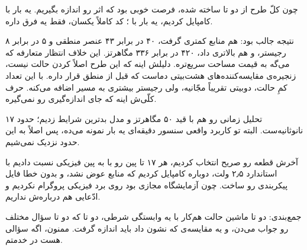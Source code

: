 \documentclass[12pt,a4paper]{article}
\newcommand{\cue}[2]{%
  \par\addvspace{1.1em}%
  \noindent{\small\bfseries\color{cuecolor}\lr{#1}\quad\textbullet\quad #2}%
  \par\nobreak\addvspace{0.3em}%
}
\begin{document}
چون کلّ طرح از دو تا  ساخته شده، فرصت خوبی بود که اثر  رو اندازه بگیریم. یه بار با  کامپایل کردیم، یه بار با ؛ کد کاملاً یکسان، فقط یه  فرق داره.

نتیجه جالب بود:  هم منابع کمتری گرفت، ۴۰ در برابر ۴۳ عنصر منطقی و ۵ در برابر ۸ رجیستر، و هم  بالاتری داد، ۴۲۰ در برابر ۳۳۶ مگاهرتز. این خلاف انتظار متعارفه که می‌گه  به قیمت مساحت سریع‌تره. دلیلش اینه که  این طرح اصلاً  کردن حالت نیست، زنجیره‌ی مقایسه‌کننده‌های هشت‌بیتی دماست که قبل از منطق  قرار داره. با این تعداد کمِ حالت،  دوبیتی تقریباً مجّانیه، ولی  رجیستر بیشتری به مسیر اضافه می‌کنه. حرف کلّی‌ش اینه که  جای اندازه‌گیری رو نمی‌گیره.

تحلیل زمانی رو هم با قید ۵۰ مگاهرتز و مدل بدترین شرایط زدیم؛  حدود ۱۷ نانوثانیه‌ست. البته تو کاربرد واقعی سنسور دقیقه‌ای یه بار نمونه می‌ده، پس اصلاً به این حدود نزدیک نمی‌شیم.

\cue{4:50}{جمع‌بندی}
آخرش قطعه رو صریح انتخاب کردیم، هر ۱۷ تا پین رو با  به پین فیزیکی نسبت دادیم با استاندارد ۲٫۵ ولت، دوباره کامپایل کردیم که منابع عوض نشد، و  بدون خطا فایل پیکربندی رو ساخت. چون آزمایشگاه مجازی بود روی برد فیزیکی پروگرام نکردیم و ادّعایی هم درباره‌ش نداریم.

جمع‌بندی: دو تا ماشین حالت هم‌کار با یه وابستگی شرطی، دو تا  که دو تا سؤال مختلف رو جواب می‌دن، و یه مقایسه‌ی  که نشون داد باید اندازه گرفت. ممنون، اگه سؤالی هست در خدمتم.
\end{document}
